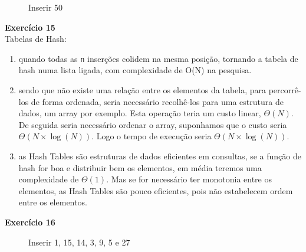 \documentclass[a4paper,11pt]{article}
\begin{document}
\begin{figure}[H]
	\centering
	\caption{Inserir 50}
\end{figure}


\noindent \textbf{Exercício 15}\\

\noindent Tabelas de Hash:
\begin{enumerate}[label=\alph*)]
	\item quando todas as \texttt{n} inserções colidem na mesma posição, tornando a tabela de hash numa lista ligada, com complexidade de O(N) na pesquisa.
	\item sendo que não existe uma relação entre os elementos da tabela, para percorrê-los de forma ordenada, seria necessário recolhê-los para uma estrutura de dados, um array por exemplo. Esta operação teria um custo linear, $ \Theta(N) $. De seguida seria necessário ordenar o array, suponhamos que o custo seria $ \Theta(N \times \log(N)) $. Logo o tempo de execução seria $ \Theta(N \times \log(N)) $.
	\item as Hash Tables são estruturas de dados eficientes em consultas, se a função de hash for boa e distribuir bem os elementos, em média teremos uma complexidade de $ \Theta(1) $. Mas se for necessário ter monotonia entre os elementos, as Hash Tables são pouco eficientes, pois não estabelecem ordem entre os elementos.
\end{enumerate}

\newpage

\noindent \textbf{Exercício 16}

\begin{figure}[H]
	\centering
	\caption{Inserir 1, 15, 14, 3, 9, 5 e 27}
\end{figure}
\end{document}
